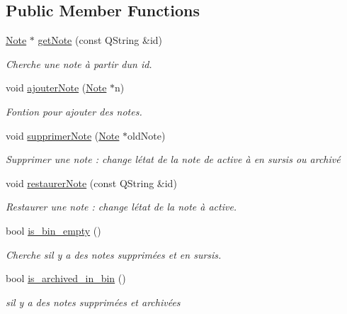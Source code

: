 \subsection*{Public Member Functions}
\begin{DoxyCompactItemize}
\item 
\hyperlink{class_note}{Note} $\ast$ \hyperlink{class_notes_manager_ae894de6eaff817932b09addc17a25753}{get\+Note} (const Q\+String \&id)
\begin{DoxyCompactList}\small\item\em Cherche une note à partir d\textquotesingle{}un id. \end{DoxyCompactList}\item 
void \hyperlink{class_notes_manager_af2d7d2d4d4bb575ce7962e5f011143cc}{ajouter\+Note} (\hyperlink{class_note}{Note} $\ast$n)
\begin{DoxyCompactList}\small\item\em Fontion pour ajouter des notes. \end{DoxyCompactList}\item 
void \hyperlink{class_notes_manager_a9fbe6a700b35ca996ddefa97cb15f6fb}{supprimer\+Note} (\hyperlink{class_note}{Note} $\ast$old\+Note)
\begin{DoxyCompactList}\small\item\em Supprimer une note \+: change l\textquotesingle{}état de la note de active à en sursis ou archivé \end{DoxyCompactList}\item 
void \hyperlink{class_notes_manager_a517a77d36ccefd26d197f0fce26adc74}{restaurer\+Note} (const Q\+String \&id)
\begin{DoxyCompactList}\small\item\em Restaurer une note \+: change l\textquotesingle{}état de la note à active. \end{DoxyCompactList}\item 
bool \hyperlink{class_notes_manager_ab90ffbdeb712e505dd01e4e0dd5b4137}{is\+\_\+bin\+\_\+empty} ()
\begin{DoxyCompactList}\small\item\em Cherche s\textquotesingle{}il y a des notes supprimées et en sursis. \end{DoxyCompactList}\item 
bool \hyperlink{class_notes_manager_a7a9a8a645616683e41d0f06402e9e500}{is\+\_\+archived\+\_\+in\+\_\+bin} ()
\begin{DoxyCompactList}\small\item\em s\textquotesingle{}il y a des notes supprimées et archivées \end{DoxyCompactList}\item 

\end{DoxyCompactItemize}
